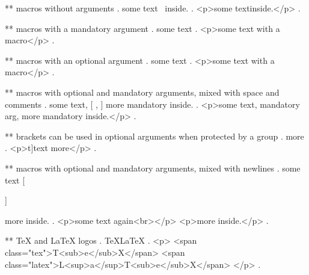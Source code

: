 ** macros without arguments
.
some text \echo\ inside.
.
<p>some text ​ inside.</p>
.

** macros with a mandatory argument
.
some text 
.
<p>some text with a macro</p>
.

** macros with an optional argument
.
some text 
.
<p>some text with a macro</p>
.


** macros with optional and mandatory arguments, mixed with space and comments
.
some text,  [%
,  %
 ]
 {more mandatory} inside.
.
<p>some text, mandatory arg, more mandatory​ inside.</p>
.


** brackets can be used in optional arguments when protected by a group
.
\echo[{t]}t]{ext} more
.
<p>t]text​ more</p>
.



** macros with optional and mandatory arguments, mixed with newlines
.
some text  [ %

 ]%

  {more} inside.
.
<p>some text again<br></p>
<p>more​ inside.</p>
.


** TeX and LaTeX logos
.
\TeX \LaTeX
.
<p>
<span class="tex">T<sub>e</sub>X</span>
<span class="latex">L<sup>a</sup>T<sub>e</sub>X</span>
</p>
.
